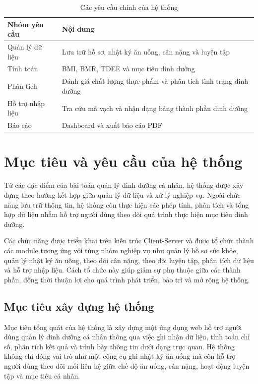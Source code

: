 \documentclass[12pt, a4paper]{report}
\begin{document}
\begin{table}[htbp]
    \centering
    \caption{Các yêu cầu chính của hệ thống}
    \label{tab:yeu_cau_he_thong}
    \vspace{4pt}
    \renewcommand{\arraystretch}{1.3}
    \begin{tabular}{|>{\raggedright\arraybackslash}p{4cm}|p{11cm}|}
        \hline
        \textbf{Nhóm yêu cầu} & \textbf{Nội dung} \\
        \hline
        Quản lý dữ liệu & Lưu trữ hồ sơ, nhật ký ăn uống, cân nặng và luyện tập \\
        \hline
        Tính toán & BMI, BMR, TDEE và mục tiêu dinh dưỡng \\
        \hline
        Phân tích & Đánh giá chất lượng thực phẩm và phân tích tình trạng dinh dưỡng \\
        \hline
        Hỗ trợ nhập liệu & Tra cứu mã vạch và nhận dạng bảng thành phần dinh dưỡng \\
        \hline
        Báo cáo & Dashboard và xuất báo cáo PDF \\
        \hline
    \end{tabular}
\end{table}
\section{Mục tiêu và yêu cầu của hệ thống}
Từ các đặc điểm của bài toán quản lý dinh dưỡng cá nhân, hệ thống được xây dựng theo hướng kết hợp giữa quản lý dữ liệu và xử lý nghiệp vụ. Ngoài chức năng lưu trữ thông tin, hệ thống còn thực hiện các phép tính, phân tích và tổng hợp dữ liệu nhằm hỗ trợ người dùng theo dõi quá trình thực hiện mục tiêu dinh dưỡng.

Các chức năng được triển khai trên kiến trúc Client-Server và được tổ chức thành các module tương ứng với từng nhóm nghiệp vụ như quản lý hồ sơ sức khỏe, quản lý nhật ký ăn uống, theo dõi cân nặng, theo dõi luyện tập, phân tích dữ liệu và hỗ trợ nhập liệu. Cách tổ chức này giúp giảm sự phụ thuộc giữa các thành phần, đồng thời thuận lợi cho quá trình phát triển, bảo trì và mở rộng hệ thống.

\subsection{Mục tiêu xây dựng hệ thống}
Mục tiêu tổng quát của hệ thống là xây dựng một ứng dụng web hỗ trợ người dùng quản lý dinh dưỡng cá nhân thông qua việc ghi nhận dữ liệu, tính toán chỉ số, phân tích kết quả và trình bày thông tin dưới dạng trực quan. Hệ thống không chỉ đóng vai trò như một công cụ ghi nhật ký ăn uống mà còn hỗ trợ người dùng theo dõi mối liên hệ giữa chế độ ăn uống, cân nặng, hoạt động luyện tập và mục tiêu cá nhân.
\end{document}
